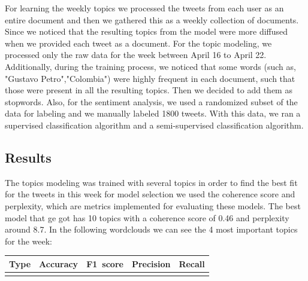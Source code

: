 \documentclass[10pt,a4paper]{article} %
\begin{document}
For learning the weekly topics we processed the tweets from each user as an entire document and then we gathered this as a weekly collection of documents. Since we noticed that the resulting topics from the model were more diffused when we provided each tweet as a document. For the topic modeling, we processed only the raw data for the week between April 16 to April 22. Additionally, during the training process, we noticed that some words (such as, "Gustavo Petro","Colombia") were highly frequent in each document, such that those were present in all the resulting topics. Then we decided to add them as stopwords. Also, for the sentiment analysis, we used a randomized subset of the data for labeling and we manually labeled 1800 tweets. With this data, we ran a supervised classification algorithm and a semi-supervised classification algorithm.
	
		\subsection{Results}

The topics modeling was trained with several topics in order to find the best fit for the tweets in this week for model selection we used the coherence score and perplexity, which are metrics implemented for evaluating these models. The best model that ge got has 10 topics with a coherence score of 0.46 and perplexity around 8.7. In the following wordclouds we can see the 4 most important topics for the week: \\

\begin{center}
	\begin{tabular}{c|c|c|c|c}%
		\bfseries Type & Accuracy & F1~score & Precision & Recall %
		\csvreader[head to column names]{results_classification.csv}{}%
		{\\\hline\type & \accuracy & \fscore & \precision & \recall}%
	\end{tabular}
\end{center}

\pagebreak
\end{document}

